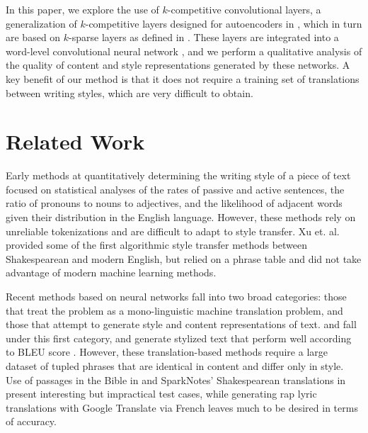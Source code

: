 \documentclass{vldb}
\begin{document}
In this paper, we explore the use of $k$-competitive convolutional layers, a generalization of $k$-competitive layers designed for autoencoders in \cite{KATE}, which in turn are based on $k$-sparse layers as defined in \cite{MakhzaniF13}. These layers are integrated into a word-level convolutional neural network \cite{Kim14f}, and we perform a qualitative analysis of the quality of content and style representations generated by these networks. A key benefit of our method is that it does not require a training set of translations between writing styles, which are very difficult to obtain.

\section{Related Work}
Early methods at quantitatively determining the writing style of a piece of text focused on statistical analyses of the rates of passive and active sentences, the ratio of pronouns to nouns to adjectives, and the likelihood of adjacent words given their distribution in the English language. However, these methods rely on unreliable tokenizations and are difficult to adapt to style transfer. Xu et. al. \cite{Xu12} provided some of the first algorithmic style transfer methods between Shakespearean and modern English, but relied on a phrase table and did not take advantage of modern machine learning methods. 

Recent methods based on neural networks fall into two broad categories: those that treat the problem as a mono-linguistic machine translation problem, and those that attempt to generate style and content representations of text.  \cite{Carlson17} and \cite{Jang16} fall under this first category, and generate stylized text that perform well according to BLEU score \cite{Papineni02}. However, these translation-based methods require a large dataset of tupled phrases that are identical in content and differ only in style. Use of passages in the Bible in \cite{Carlson17} and SparkNotes' Shakespearean translations in \cite{Jang16} present interesting but impractical test cases, while generating rap lyric translations with Google Translate via French \cite{Jang16} leaves much to be desired in terms of accuracy. 
\end{document}
